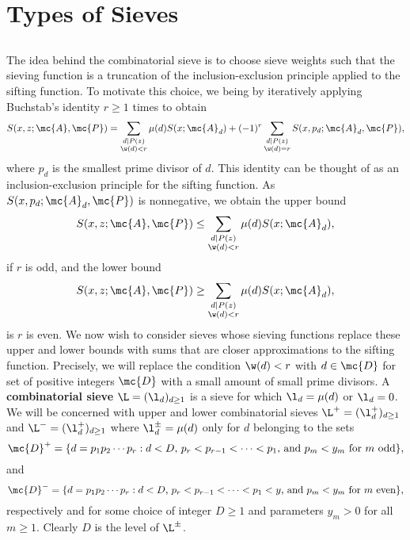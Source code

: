\chapter{Types of Sieves}
  \section{}
    The idea behind the combinatorial sieve is to choose sieve weights such that the sieving function is a truncation of the inclusion-exclusion principle applied to the sifting function. To motivate this choice, we being by iteratively applying Buchstab's identity $r \ge 1$ times to obtain
    \[
      S(x,z;\mc{A},\mc{P}) = \sum_{\substack{d \mid P(z) \\ \w(d) < r}}\mu(d)S(x;\mc{A}_{d})+(-1)^{r}\sum_{\substack{d \mid P(z) \\ \w(d) = r}}S(x,p_{d};\mc{A}_{d},\mc{P}),
    \]
    where $p_{d}$ is the smallest prime divisor of $d$. This identity can be thought of as an inclusion-exclusion principle for the sifting function. As $S(x,p_{d};\mc{A}_{d},\mc{P})$ is nonnegative, we obtain the upper bound
    \[
      S(x,z;\mc{A},\mc{P}) \le \sum_{\substack{d \mid P(z) \\ \w(d) < r}}\mu(d)S(x;\mc{A}_{d}),
    \]
    if $r$ is odd, and the lower bound
    \[
      S(x,z;\mc{A},\mc{P}) \ge \sum_{\substack{d \mid P(z) \\ \w(d) < r}}\mu(d)S(x;\mc{A}_{d}),
    \]
    is $r$ is even. We now wish to consider sieves whose sieving functions replace these upper and lower bounds with sums that are closer approximations to the sifting function. Precisely, we will replace the condition $\w(d) < r$ with $d \in \mc{D}$ for set of positive integers $\mc{D}$ with a small amount of small prime divisors. A \textbf{combinatorial sieve} $\L = (\l_{d})_{d \ge 1}$ is a sieve for which $\l_{d} = \mu(d)$ or $\l_{d} = 0$. We will be concerned with upper and lower combinatorial sieves $\L^{+} = (\l_{d}^{+})_{d \ge 1}$ and $\L^{-} = (\l_{d}^{+})_{d \ge 1}$ where $\l_{d}^{\pm} = \mu(d)$ only for $d$ belonging to the sets
    \[
      \mc{D}^{+} = \{d = p_{1}p_{2} \cdots p_{r}:\text{$d < D$, $p_{r} < p_{r-1} < \cdots < p_{1}$, and $p_{m} < y_{m}$ for $m$ odd}\},
    \]
    and
    \[
      \mc{D}^{-} = \{d = p_{1}p_{2} \cdots p_{r}:\text{$d < D$, $p_{r} < p_{r-1} < \cdots < p_{1} < y$, and $p_{m} < y_{m}$ for $m$ even}\},
    \]
    respectively and for some choice of integer $D \ge 1$ and parameters $y_{m} > 0$ for all $m \ge 1$. Clearly $D$ is the level of $\L^{\pm}$.
  \section{}
  \section{}